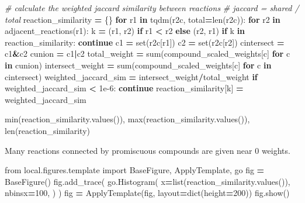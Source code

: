 \documentclass[
]{book}
\newenvironment{Shaded}{\begin{snugshade}}{\end{snugshade}}
\newcommand{\BuiltInTok}[1]{#1}
\newcommand{\CommentTok}[1]{\textcolor[rgb]{0.56,0.35,0.01}{\textit{#1}}}
\newcommand{\ControlFlowTok}[1]{\textcolor[rgb]{0.13,0.29,0.53}{\textbf{#1}}}
\newcommand{\DecValTok}[1]{\textcolor[rgb]{0.00,0.00,0.81}{#1}}
\newcommand{\FloatTok}[1]{\textcolor[rgb]{0.00,0.00,0.81}{#1}}
\newcommand{\ImportTok}[1]{#1}
\newcommand{\KeywordTok}[1]{\textcolor[rgb]{0.13,0.29,0.53}{\textbf{#1}}}
\newcommand{\NormalTok}[1]{#1}
\newcommand{\OperatorTok}[1]{\textcolor[rgb]{0.81,0.36,0.00}{\textbf{#1}}}
\begin{document}
\begin{Shaded}
\begin{Highlighting}[numbers=left,,]
\CommentTok{\# calculate the weighted jaccard similarity between reactions}
\CommentTok{\# jaccard = shared / total}
\NormalTok{reaction\_similarity }\OperatorTok{=}\NormalTok{ \{\}}
\ControlFlowTok{for}\NormalTok{ r1 }\KeywordTok{in}\NormalTok{ tqdm(r2c, total}\OperatorTok{=}\BuiltInTok{len}\NormalTok{(r2c)):}
    \ControlFlowTok{for}\NormalTok{ r2 }\KeywordTok{in}\NormalTok{ adjacent\_reactions(r1):}
\NormalTok{        k }\OperatorTok{=}\NormalTok{ (r1, r2) }\ControlFlowTok{if}\NormalTok{ r1 }\OperatorTok{\textless{}}\NormalTok{ r2 }\ControlFlowTok{else}\NormalTok{ (r2, r1)}
        \ControlFlowTok{if}\NormalTok{ k }\KeywordTok{in}\NormalTok{ reaction\_similarity: }\ControlFlowTok{continue}
\NormalTok{        c1 }\OperatorTok{=} \BuiltInTok{set}\NormalTok{(r2c[r1])}
\NormalTok{        c2 }\OperatorTok{=} \BuiltInTok{set}\NormalTok{(r2c[r2])}
\NormalTok{        cintersect }\OperatorTok{=}\NormalTok{ c1}\OperatorTok{\&}\NormalTok{c2}
\NormalTok{        cunion }\OperatorTok{=}\NormalTok{ c1}\OperatorTok{|}\NormalTok{c2}
\NormalTok{        total\_weight }\OperatorTok{=} \BuiltInTok{sum}\NormalTok{(compound\_scaled\_weights[c] }\ControlFlowTok{for}\NormalTok{ c }\KeywordTok{in}\NormalTok{ cunion)}
\NormalTok{        intersect\_weight }\OperatorTok{=} \BuiltInTok{sum}\NormalTok{(compound\_scaled\_weights[c] }\ControlFlowTok{for}\NormalTok{ c }\KeywordTok{in}\NormalTok{ cintersect)}
\NormalTok{        weighted\_jaccard\_sim }\OperatorTok{=}\NormalTok{ intersect\_weight}\OperatorTok{/}\NormalTok{total\_weight}
        \ControlFlowTok{if}\NormalTok{ weighted\_jaccard\_sim }\OperatorTok{\textless{}} \FloatTok{1e{-}6}\NormalTok{: }\ControlFlowTok{continue}
\NormalTok{        reaction\_similarity[k] }\OperatorTok{=}\NormalTok{ weighted\_jaccard\_sim}

\BuiltInTok{min}\NormalTok{(reaction\_similarity.values()), }\BuiltInTok{max}\NormalTok{(reaction\_similarity.values()), }\BuiltInTok{len}\NormalTok{(reaction\_similarity)}
\end{Highlighting}
\end{Shaded}

Many reactions connected by promiscuous compounds are given near 0 weights.

\begin{Shaded}
\begin{Highlighting}[numbers=left,,]
\ImportTok{from}\NormalTok{ local.figures.template }\ImportTok{import}\NormalTok{ BaseFigure, ApplyTemplate, go}
\NormalTok{fig }\OperatorTok{=}\NormalTok{ BaseFigure()}
\NormalTok{fig.add\_trace(}
\NormalTok{    go.Histogram(}
\NormalTok{        x}\OperatorTok{=}\BuiltInTok{list}\NormalTok{(reaction\_similarity.values()),}
\NormalTok{        nbinsx}\OperatorTok{=}\DecValTok{100}\NormalTok{,}
\NormalTok{    )}
\NormalTok{)}
\NormalTok{fig }\OperatorTok{=}\NormalTok{ ApplyTemplate(fig, layout}\OperatorTok{=}\BuiltInTok{dict}\NormalTok{(height}\OperatorTok{=}\DecValTok{200}\NormalTok{))}
\NormalTok{fig.show()}
\end{Highlighting}
\end{Shaded}
\end{document}
